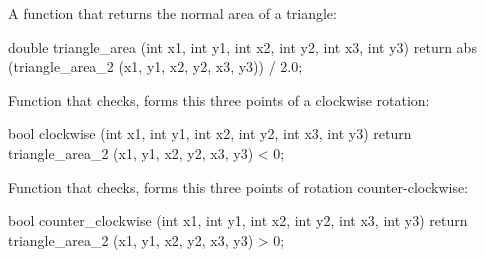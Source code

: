 A function that returns the normal area of a triangle:

\code
double triangle_area (int x1, int y1, int x2, int y2, int x3, int y3) {
return abs (triangle_area_2 (x1, y1, x2, y2, x3, y3)) / 2.0;
}
\endcode

Function that checks, forms this three points of a clockwise rotation:

\code
bool clockwise (int x1, int y1, int x2, int y2, int x3, int y3) {
return triangle_area_2 (x1, y1, x2, y2, x3, y3) < 0;
}
\endcode

Function that checks, forms this three points of rotation counter-clockwise:

\code
bool counter_clockwise (int x1, int y1, int x2, int y2, int x3, int y3) {
return triangle_area_2 (x1, y1, x2, y2, x3, y3) > 0;
}
\endcode